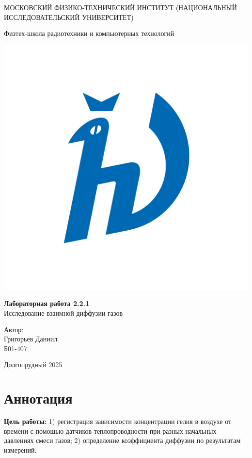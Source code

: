 \documentclass[a4paper,12pt]{article}
\begin{document}
\begin{titlepage}
\begin{center}
    {\large МОСКОВСКИЙ ФИЗИКО-ТЕХНИЧЕСКИЙ ИНСТИТУТ (НАЦИОНАЛЬНЫЙ ИССЛЕДОВАТЕЛЬСКИЙ УНИВЕРСИТЕТ)}
\end{center}

\begin{center}
    {\large Физтех-школа радиотехники и компьютерных технологий}
\end{center}

\vspace{3.5cm}

\begin{center}
    \includegraphics[width=0.4\linewidth]{hv_full.png}
\end{center}

\vspace{0.1cm}

{\huge
\begin{center}
    {\bf Лабораторная работа 2.2.1}\\
    Исследование взаимной диффузии газов
\end{center}
}

\vspace{2cm}

\begin{flushright}
{\LARGE Автор:\\ Григорьев Даниил \\
\vspace{0.2cm}
Б01-407}
\end{flushright}

\vspace{3.5cm}
\begin{center}
    Долгопрудный 2025
\end{center}
\end{titlepage}

\section{Аннотация}
    \textbf{Цель работы:} 1) регистрация зависимости концентрации гелия в воздухе от времени с помощью датчиков теплопроводности при разных начальных давлениях смеси газов; 2) определение коэффициента диффузии по результатам измерений.
\end{document}
